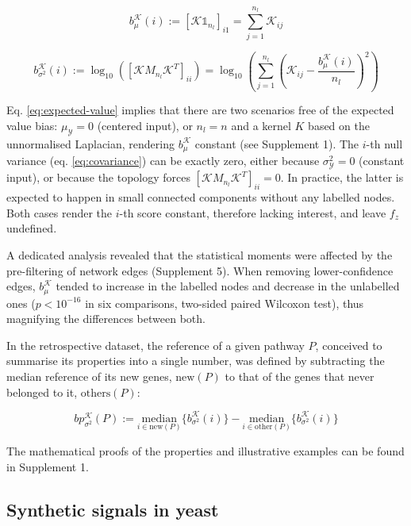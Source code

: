 \documentclass[final]{bioinfo}
\newcommand{\ebias}{b_{\mu}^{\mathcal{K}}}
\newcommand{\vbias}{b_{\sigma^2}^{\mathcal{K}}}
\newcommand{\pbias}{bp_{\sigma^2}^{\mathcal{K}}}
\begin{document}
\begin{equation}\label{eq:bias-e}
    \ebias(i) := [\mathcal{K} \mathbb{1}_{n_l}]_{i1} = \sum_{j = 1}^{n_l} \mathcal{K}_{ij}
\end{equation}

\begin{equation}\label{eq:bias-var}
    \vbias(i) := \log_{10} \left(\left[\mathcal{K} M_{n_l} \mathcal{K}^T\right]_{ii}\right) = \log_{10} \left( \sum_{j = 1}^{n_l} \left(\mathcal{K}_{ij} - \frac{\ebias(i)}{n_l} \right)^2 \right)
\end{equation}

Eq. \ref{eq:expected-value} implies that there are two scenarios free of the expected value bias: $\mu_{\mathcal{Y}} = 0$ (centered input), or $n_l = n$ and a kernel $K$ based on the unnormalised Laplacian, rendering $\ebias$ constant (see Supplement 1).
The $i$-th null variance (eq. \ref{eq:covariance}) can be exactly zero, either because $\sigma_{\mathcal{Y}}^2 = 0$ (constant input), or because the topology forces $[\mathcal{K} M_{n_l} \mathcal{K}^T]_{ii} = 0$.
In practice, the latter is expected to happen in small connected components without any labelled nodes.
Both cases render the $i$-th score constant, therefore lacking interest, and leave $f_z$ undefined.

A dedicated analysis revealed that the statistical moments were affected by the pre-filtering of network edges (Supplement 5).
When removing lower-confidence edges, $\ebias$ tended to increase in the labelled nodes and decrease in the unlabelled ones ($p<10^{-16}$ in six comparisons, two-sided paired Wilcoxon test), thus magnifying the differences between both.

In the retrospective dataset, the reference of a given pathway $P$, conceived to summarise its properties into a single number, was defined by subtracting the median reference of its new genes, $\textrm{new}(P)$ to that of the genes that never belonged to it, $\textrm{others}(P)$:

\begin{equation}\label{eq:bias-var-pathway}
    \pbias(P) := \underset{i \in \textrm{new}(P)}{\textrm{median}}\{\vbias(i)\} - \underset{i \in \textrm{other}(P)}{\textrm{median}}\{\vbias(i)\}
\end{equation}

The mathematical proofs of the properties and illustrative examples can be found in Supplement 1. 

\subsection*{Synthetic signals in yeast}
\end{document}
